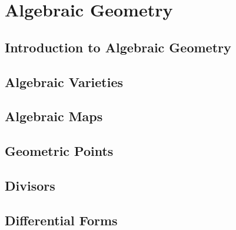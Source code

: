 
\part{Algebraic Geometry}

\chapter{Introduction to Algebraic Geometry}







\chapter{Algebraic Varieties}






\chapter{Algebraic Maps}






\chapter{Geometric Points}






\chapter{Divisors}









\chapter{Differential Forms}







